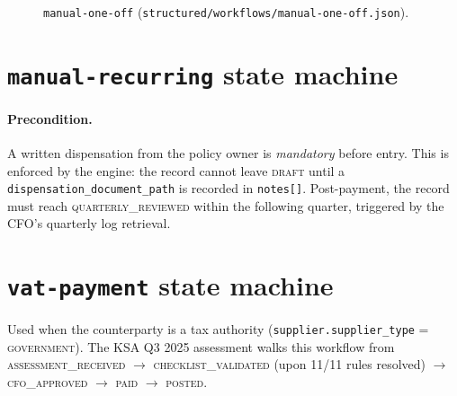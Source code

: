 \documentclass[11pt,a4paper,twoside]{report}
\newcommand{\corpus}{}
\begin{document}
\begin{figure}[htbp]
\centering
{}
\caption{\texttt{manual-one-off}
(\corpus\texttt{structured/workflows/manual-one-off.json}).}
\label{fig:manual-one-off}
\end{figure}

\section{\texttt{manual-recurring} state machine}

\paragraph{Precondition.} A written dispensation from the policy owner
is \emph{mandatory} before entry. This is enforced by the engine: the
record cannot leave \textsc{draft} until a
\texttt{dispensation\_document\_path} is recorded in \texttt{notes[]}.
Post-payment, the record must reach \textsc{quarterly\_reviewed} within
the following quarter, triggered by the CFO's quarterly log retrieval.

\section{\texttt{vat-payment} state machine}

Used when the counterparty is a tax authority
(\texttt{supplier.supplier\_type} = \textsc{government}). The KSA Q3
2025 assessment walks this workflow from
\textsc{assessment\_received} $\to$ \textsc{checklist\_validated}
(upon 11/11 rules resolved) $\to$ \textsc{cfo\_approved} $\to$
\textsc{paid} $\to$ \textsc{posted}.
\end{document}
